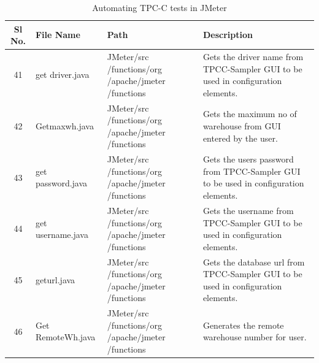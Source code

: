 \documentclass[12pt]{book}
\begin{document}
 \begin{table}[H]
  \begin{center}
   \begin{tabular}{|c|p{3cm}|p{5cm}|p{6cm}|} 
   \hline
   \textbf{Sl No.} & \textbf{File Name} & \textbf{Path} & \textbf{Description}\\
   \hline
   41 & get driver.java & JMeter/src /functions/org /apache/jmeter /functions & Gets the driver name from TPCC-Sampler GUI to be used in configuration elements.\\
   \hline
   42 & Getmaxwh.java & JMeter/src /functions/org /apache/jmeter /functions & Gets the maximum no of warehouse from GUI entered by the user.\\
   \hline 
   43 & get password.java & JMeter/src /functions/org /apache/jmeter /functions & Gets the users password from TPCC-Sampler GUI to be used in configuration elements.\\
   \hline
   44 & get username.java & JMeter/src /functions/org /apache/jmeter /functions & Gets the username from TPCC-Sampler GUI to be used in configuration elements.\\
   \hline
   45 & geturl.java & JMeter/src /functions/org /apache/jmeter /functions & Gets the database url from TPCC-Sampler GUI to be used in configuration elements.\\
   \hline
   46 & Get RemoteWh.java & JMeter/src /functions/org /apache/jmeter /functions & Generates the remote warehouse number for user.\\
   \hline
   \end{tabular}
   \caption{Automating TPC-C tests in JMeter}
  \end{center}
 \end{table}
 
\end{document}
